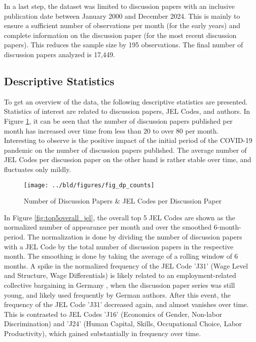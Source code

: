 \documentclass[11pt, a4paper, leqno]{article}
\begin{document}
In a last step, the dataset was limited to discussion papers with an inclusive publication date between January 2000 and December 2024.
This is mainly to ensure a sufficient number of observations per month (for the early years) and complete information on the discussion paper (for the most recent discussion papers).
This reduces the sample size by 195 observations. The final number of discussion papers analyzed is 17,449.

\subsection{Descriptive Statistics}
To get an overview of the data, the following descriptive statistics are presented.
Statistics of interest are related to discussion papers, JEL Codes, and authors.
In Figure \ref{fig:dp_counts}, it can be seen that the number of discussion papers published per month has increased over time from less than 20 to over 80 per month.
Interesting to observe is the positive impact of the initial period of the COVID-19 pandemic on the number of discussion papers published.
The average number of JEL Codes per discussion paper on the other hand is rather stable over time, and fluctuates only mildly.

\begin{figure}
    \centering
    \texttt{[image: ../bld/figures/fig\_dp\_counts]}
    \caption{Number of Discussion Papers \& JEL Codes per Discussion Paper}
    \label{fig:dp_counts}
\end{figure}

In Figure \ref{fig:top5overall_jel}, the overall top 5 JEL Codes are shown as the normalized number of appearance per month and over the smoothed 6-month-period.
The normalization is done by dividing the number of discussion papers with a JEL Code by the total number of discussion papers in the respective month.
The smoothing is done by taking the average of a rolling window of 6 months.
A spike in the normalized frequency of the JEL Code 'J31' (Wage Level and Structure, Wage Differentials) is likely related to an employment-related collective bargaining in Germany \citep{institutfurarbeitsrechtundarbeitsbeziehungenindereuropaischenunioniaaeuuniversitattrier2001}, when the discussion paper series was still young, and likely used frequently by German authors.
After this event, the frequency of the JEL Code 'J31' decreased again, and almost vanishes over time.
This is contrasted to JEL Codes 'J16' (Economics of Gender, Non-labor Discrimination) and 'J24' (Human Capital, Skills, Occupational Choice, Labor Productivity), which gained substantially in frequency over time.
\end{document}
